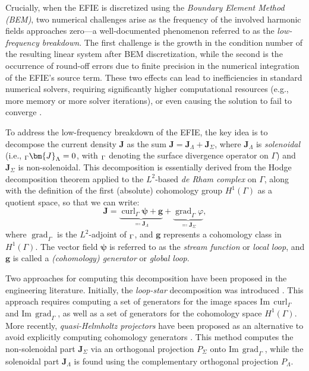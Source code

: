 \documentclass[a4paper,twoside,10pt]{article}
\theoremstyle{plain}
\theoremstyle{definition}
\theoremstyle{remark}
\let\div\relax
\DeclareMathOperator{\grad}{grad}
\DeclareMathOperator{\div}{div}
\DeclareMathOperator{\curl}{curl}
\begin{document}
Crucially, when the EFIE is discretized using the \emph{Boundary Element Method (BEM)}, two numerical challenges arise as the frequency of the involved harmonic fields approaches zero---a well-documented phenomenon referred to as the \emph{low-frequency breakdown}.
The first challenge is the growth in the condition number of the resulting linear system after BEM discretization, while the second is the occurrence of round-off errors due to finite precision in the numerical integration of the EFIE's source term.
These two effects can lead to inefficiencies in standard numerical solvers, requiring significantly higher computational resources (e.g., more memory or more solver iterations), or even causing the solution to fail to converge \cite{adrian2021electromagnetic}.

To address the low-frequency breakdown of the EFIE, the key idea is to decompose the current density $\bm{J}$ as the sum $\bm{J} = \bm{J}_{\Lambda} + \bm{J}_{\Sigma}$, where $\bm{J}_{\Lambda}$ is \emph{solenoidal} (i.e., $\div_\Gamma \bm{J}_{\Lambda} = 0$, with $\div_\Gamma$ denoting the surface divergence operator on $\Gamma$) and $\bm{J}_{\Sigma}$ is non-solenoidal.
This decomposition is essentially derived from the Hodge decomposition theorem applied to the $L^2$-based \emph{de Rham complex} on $\Gamma$, along with the definition of the first (absolute) cohomology group $H^1(\Gamma)$ as a quotient space, so that we can write:
\begin{equation}
\bm{J} = \underbrace{\curl_\Gamma \bm{\psi} + \bm{g}}_{\eqqcolon \bm{J}_{\Lambda}} + \underbrace{\grad_\Gamma \varphi}_{\eqqcolon \bm{J}_{\Sigma}},
\label{eq:quasi-Helmholtz}
\end{equation}
where $\grad_\Gamma$ is the $L^2$-adjoint of $\div_\Gamma$, and $\bm{g}$ represents a cohomology class in $H^1(\Gamma)$.
The vector field $\bm{\psi}$ is referred to as the \emph{stream function} or \emph{local loop}, and $\bm{g}$ is called a \emph{(cohomology) generator} or \emph{global loop}.

Two approaches for computing this decomposition have been proposed in the engineering literature.
Initially, the \emph{loop-star} decomposition was introduced \cite{vecchi1999loop, andriulli2012loop}. This approach requires computing a set of generators for the image spaces $\mathrm{Im} \, \curl_\Gamma$ and $\mathrm{Im} \, \grad_\Gamma$, as well as a set of generators for the cohomology space $H^1(\Gamma)$.
More recently, \emph{quasi-Helmholtz projectors} have been proposed as an alternative to avoid explicitly computing cohomology generators \cite{andriulli2012well}.
This method computes the non-solenoidal part $\bm{J}_{\Sigma}$ via an orthogonal projection $P_{\Sigma}$ onto $\mathrm{Im} \, \grad_\Gamma$, while the solenoidal part $\bm{J}_{\Lambda}$ is found using the complementary orthogonal projection $P_{\Lambda}$.
\end{document}
